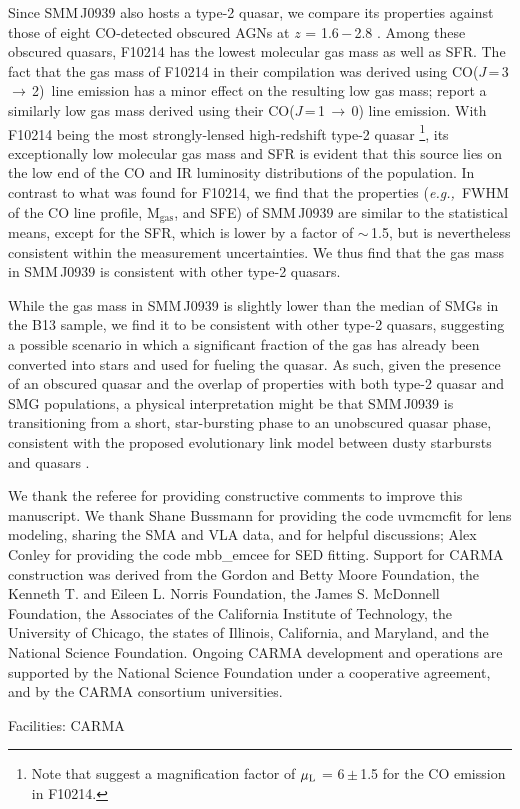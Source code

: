 \documentclass[iop, revtex4]{emulateapj}
\newcommand{\rarr}{$\rightarrow$}
\newcommand{\CO}{\mbox{CO($J$\,=\,3\,$\rightarrow$\,2) }}
\newcommand{\eg}{{\sl e.g.,~}}
\begin{document}
Since SMM\,J0939 also hosts a type-2 quasar, we compare its properties
against those of eight CO-detected obscured AGNs at $z$ = 1.6\,$-$\,2.8 \citep[][and references
therein]{Polletta11a}.
Among these obscured quasars, F10214 has the lowest molecular gas mass as well as SFR. The fact that the gas mass of F10214 in their compilation was derived using \CO line emission \citep{Solomon05a} has a minor effect on the resulting low gas mass; \citet{Riechers11a} report
a similarly low gas mass derived using their CO($J$\,=\,1\,\rarr\,0) line emission.
With F10214 being the most strongly-lensed high-redshift type-2 quasar \citep[$\mu_{\textrm L}$ = 17; ][]{Solomon05a}\footnote{Note that \citet{Deane13a} suggest a magnification factor of $\mu_{\textrm L}$ = 6\,$\pm$\,1.5 for the CO emission in F10214.}, its exceptionally low molecular gas mass and SFR is evident that this source lies on the low end of the CO and IR luminosity distributions of the population.
In contrast to what was found for F10214, we find that the properties
(\eg FWHM of the CO line profile, M$_\textrm{gas}$, and SFE) of SMM\,J0939 are similar to the statistical means, except for the SFR, which is lower by a
factor of $\sim$\,1.5, but is nevertheless consistent within the measurement uncertainties. We thus find that the gas mass in SMM\,J0939 is consistent with other type-2 quasars. 

While the gas mass in SMM\,J0939 is slightly lower than the median of SMGs in the B13 sample, we find it to be consistent with other type-2 quasars, suggesting a possible scenario in which a significant fraction of the gas has already been converted into stars and used for fueling the quasar.
As such, given the presence of an obscured quasar and the overlap of properties
with both type-2 quasar and SMG populations,
a physical interpretation might be that SMM\,J0939 is transitioning from a short, star-bursting phase to an unobscured quasar phase, consistent with the proposed evolutionary link model between dusty starbursts and quasars \citep[\eg][]{Sanders88,Coppin08a,Simpson12a}.

\begin{acknowledgments}
We thank the referee for providing constructive comments to improve this manuscript.
We thank Shane Bussmann for providing the code {\sc uvmcmcfit} for lens modeling, sharing the SMA and VLA data, and for helpful discussions; Alex Conley for providing the code {\sc mbb\_emcee} for SED fitting.
Support for CARMA construction was derived from the
Gordon and Betty Moore Foundation, the Kenneth T. and Eileen
L. Norris Foundation, the James S. McDonnell Foundation, the
Associates of the California Institute of Technology, the University
of Chicago, the states of Illinois, California, and Maryland,
and the National Science Foundation.
Ongoing CARMA development
and operations are supported by the National Science
Foundation under a cooperative agreement, and by the CARMA
consortium universities.

Facilities: CARMA
\end{acknowledgments}
\end{document}
